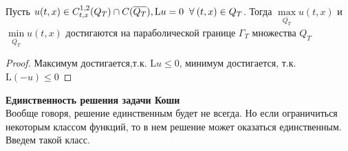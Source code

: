 \begin{conseq}
Пусть $u(t,x) \in C^{1,2}_{t,x}(Q_T) \cap C(\overline{Q_T}), \mathrm{L}u = 0 \;\;\forall\:(t,x) \in Q_T$.
 Тогда $\max\limits_{\overline{Q_T}}u(t,x)$ и $\min\limits_{\overline{Q_T}}u(t,x)$ достигаются на параболической границе $\Gamma_T$ множества $Q_T$
 \begin{proof}
 Максимум достигается,т.к. $\mathrm{L}u \leq 0$, минимум достигается, т.к. $\mathrm{L}(-u) \leq 0$
 \end{proof}
\end{conseq}


{\bf Единственность решения задачи Коши}\\
Вообще говоря, решение единственным будет не всегда. Но если
 ограничиться некоторым классом функций, то в нем решение может
  оказаться единственным. Введем такой класс.\\
  
